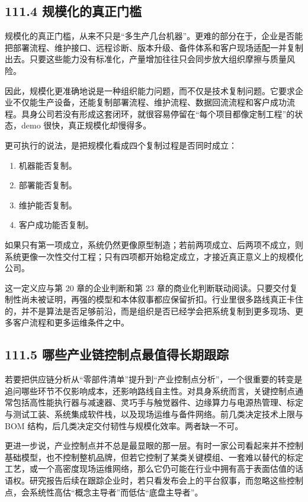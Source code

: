 \subsection*{111.4 规模化的真正门槛}


规模化的真正门槛，从来不只是“多生产几台机器”。更难的部分在于，企业是否能把部署流程、维护接口、远程诊断、版本升级、备件体系和客户现场适配一并复制出去。只要这些能力没有标准化，产量增加往往只会同步放大组织摩擦与质量风险。

因此，规模化更准确地说是一种组织能力问题，而不仅是技术复制问题。它要求企业不仅能生产设备，还能复制部署流程、维护流程、数据回流流程和客户成功流程。具身公司若没有形成这套闭环，就很容易停留在“每个项目都像定制工程”的状态，demo 很快，真正规模化却慢得多。

更可执行的说法，是把规模化看成四个复制过程是否同时成立：

\begin{enumerate}
\item 机器能否复制。
\item 部署能否复制。
\item 维护能否复制。
\item 客户成功能否复制。
\end{enumerate}

如果只有第一项成立，系统仍然更像原型制造；若前两项成立、后两项不成立，则系统更像一次性交付工程；只有四项都开始稳定成立，才接近真正意义上的规模化公司。

这一定义应与第 20 章的企业判断和第 23 章的商业化判断联动阅读。只要交付复制性尚未被证明，再强的模型和本体叙事都应保留折扣。行业里很多路线真正卡住的，并不是算法是否足够前沿，而是组织是否已经学会把系统复制到更多现场、更多客户流程和更多运维条件之中。

\subsection*{111.5 哪些产业链控制点最值得长期跟踪}


若要把供应链分析从“零部件清单”提升到“产业控制点分析”，一个很重要的转变是追问哪些环节不仅影响成本，还影响路线自主性。对具身系统而言，关键控制点通常包括高性能执行器与减速器、灵巧手与触觉器件、边缘算力与电源热管理、标定与测试工装、系统集成软件栈，以及现场运维与备件网络。前几类决定技术上限与 BOM 结构，后几类决定交付韧性与规模化效率。两者缺一不可。

更进一步说，产业控制点并不总是最显眼的那一层。有时一家公司看起来并不控制基础模型，也不控制整机品牌，但若它控制了某类关键模组、一套难以替代的标定工艺，或一个高密度现场运维网络，那么它仍可能在行业中拥有高于表面估值的话语权。研究报告后续在跟踪企业时，若只看发布会上的平台叙事，而忽略这些控制点，会系统性高估“概念主导者”而低估“底盘主导者”。

